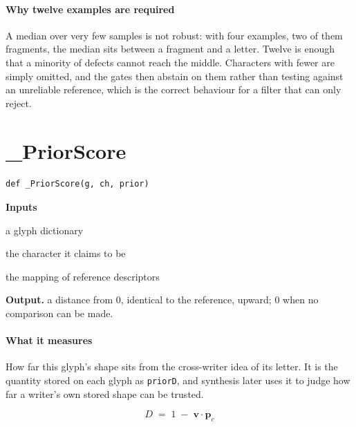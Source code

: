 \paragraph{Why twelve examples are required}
A median over very few samples is not robust: with four examples, two of them fragments, the median sits between a fragment and a letter. Twelve is enough that a minority of defects cannot reach the middle. Characters with fewer are simply omitted, and the gates then abstain on them rather than testing against an unreliable reference, which is the correct behaviour for a filter that can only reject.


\section{\_PriorScore}
\begin{lstlisting}[style=sig]
def _PriorScore(g, ch, prior)
\end{lstlisting}

\noindent\textbf{Inputs}
\begin{description}[leftmargin=2.2em,style=nextline,font=\normalfont\ttfamily]\setlength\itemsep{1pt}
  \item[{g}] \normalfont a glyph dictionary
  \item[{ch}] \normalfont the character it claims to be
  \item[{prior}] \normalfont the mapping of reference descriptors
\end{description}

\noindent\textbf{Output.} a distance from 0, identical to the reference, upward; 0 when no comparison can be made.


\paragraph{What it measures}
How far this glyph's shape sits from the cross-writer idea of its letter. It is the quantity stored on each glyph as \texttt{priorD}, and synthesis later uses it to judge how far a writer's own stored shape can be trusted.


\begin{equation}
D \;=\; 1 \;-\; \mathbf{v} \cdot \mathbf{p}_c
\end{equation}

